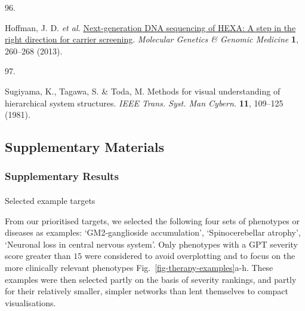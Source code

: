 \documentclass[
]{article}
\makeatletter
\let\oldparagraph\paragraph
\renewcommand{\paragraph}{
    \@ifstar
      \xxxParagraphStar
      \xxxParagraphNoStar
  }
\newcommand{\xxxParagraphStar}[1]{\oldparagraph*{#1}\mbox{}}
\newcommand{\xxxParagraphNoStar}[1]{\oldparagraph{#1}\mbox{}}
\newlength{\cslhangindent}
\newlength{\csllabelwidth}
\newenvironment{CSLReferences}[2] %
 {\begin{list}{}{%
  \setlength{\itemindent}{0pt}
  \setlength{\leftmargin}{0pt}
  \setlength{\parsep}{0pt}
  \ifodd #1
   \setlength{\leftmargin}{\cslhangindent}
   \setlength{\itemindent}{-1\cslhangindent}
  \fi
  \setlength{\itemsep}{#2\baselineskip}}}
 {\end{list}}
\newcommand{\CSLLeftMargin}[1]{\parbox[t]{\csllabelwidth}{\strut#1\strut}}
\newcommand{\CSLRightInline}[1]{\parbox[t]{\linewidth - \csllabelwidth}{\strut#1\strut}}
\makeatother
\begin{document}
\begin{CSLReferences}{0}{0}
\CSLLeftMargin{96. }%
\CSLRightInline{Hoffman, J. D. \emph{et al.}
\href{https://doi.org/10.1002/mgg3.37}{Next-generation DNA sequencing of
HEXA: A step in the right direction for carrier screening}.
\emph{Molecular Genetics \& Genomic Medicine} \textbf{1}, 260--268
(2013).}

\CSLLeftMargin{97. }%
\CSLRightInline{Sugiyama, K., Tagawa, S. \& Toda, M. Methods for visual
understanding of hierarchical system structures. \emph{IEEE Trans. Syst.
Man Cybern.} \textbf{11}, 109--125 (1981).}

\end{CSLReferences}

\hfill\break

\newpage{}

\subsection{Supplementary Materials}\label{supplementary-materials}

\subsubsection{Supplementary Results}\label{supplementary-results}

\paragraph{Selected example targets}\label{selected-example-targets-1}

From our prioritised targets, we selected the following four sets of
phenotypes or diseases as examples: `GM2-ganglioside accumulation',
`Spinocerebellar atrophy', `Neuronal loss in central nervous system'.
Only phenotypes with a GPT severity score greater than \(15\) were
considered to avoid overplotting and to focus on the more clinically
relevant phenotypes Fig.~\ref{fig-therapy-examples}a-h. These examples
were then selected partly on the basis of severity rankings, and partly
for their relatively smaller, simpler networks than lent themselves to
compact visualisations.
\end{document}
